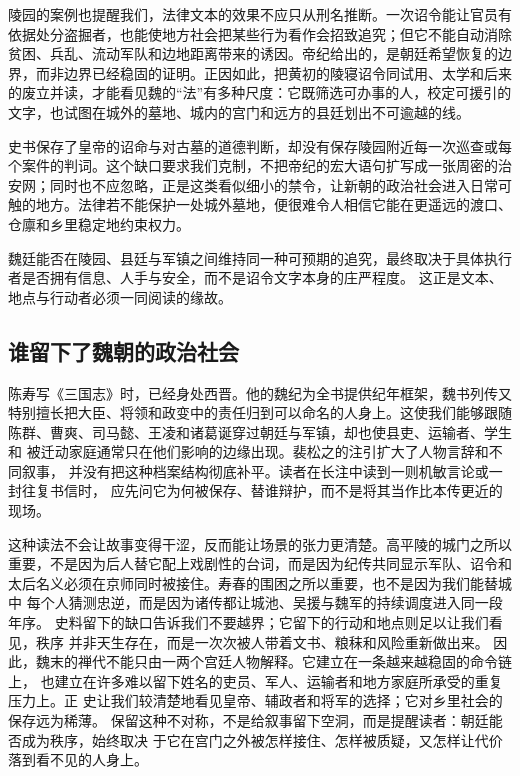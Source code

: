 陵园的案例也提醒我们，法律文本的效果不应只从刑名推断。一次诏令能让官员有依据处分盗掘者，也能使地方社会把某些行为看作会招致追究；但它不能自动消除贫困、兵乱、流动军队和边地距离带来的诱因。帝纪给出的，是朝廷希望恢复的边界，而非边界已经稳固的证明。正因如此，把黄初的陵寝诏令同试用、太学和后来的废立并读，才能看见魏的“法”有多种尺度：它既筛选可办事的人，校定可援引的文字，也试图在城外的墓地、城内的宫门和远方的县廷划出不可逾越的线。

史书保存了皇帝的诏命与对古墓的道德判断，却没有保存陵园附近每一次巡查或每个案件的判词。这个缺口要求我们克制，不把帝纪的宏大语句扩写成一张周密的治安网；同时也不应忽略，正是这类看似细小的禁令，让新朝的政治社会进入日常可触的地方。法律若不能保护一处城外墓地，便很难令人相信它能在更遥远的渡口、仓廪和乡里稳定地约束权力。

魏廷能否在陵园、县廷与军镇之间维持同一种可预期的追究，最终取决于具体执行者是否拥有信息、人手与安全，而不是诏令文字本身的庄严程度。
这正是文本、地点与行动者必须一同阅读的缘故。

\subsection{谁留下了魏朝的政治社会}

陈寿写《三国志》时，已经身处西晋。他的魏纪为全书提供纪年框架，魏书列传又
特别擅长把大臣、将领和政变中的责任归到可以命名的人身上。这使我们能够跟随
陈群、曹爽、司马懿、王凌和诸葛诞穿过朝廷与军镇，却也使县吏、运输者、学生和
被迁动家庭通常只在他们影响的边缘出现。裴松之的注引扩大了人物言辞和不同叙事，
并没有把这种档案结构彻底补平。读者在长注中读到一则机敏言论或一封往复书信时，
应先问它为何被保存、替谁辩护，而不是将其当作比本传更近的现场。

这种读法不会让故事变得干涩，反而能让场景的张力更清楚。高平陵的城门之所以
重要，不是因为后人替它配上戏剧性的台词，而是因为纪传共同显示军队、诏令和
太后名义必须在京师同时被接住。寿春的围困之所以重要，也不是因为我们能替城中
每个人猜测忠逆，而是因为诸传都让城池、吴援与魏军的持续调度进入同一段年序。
史料留下的缺口告诉我们不要越界；它留下的行动和地点则足以让我们看见，秩序
并非天生存在，而是一次次被人带着文书、粮秣和风险重新做出来。
因此，魏末的禅代不能只由一两个宫廷人物解释。它建立在一条越来越稳固的命令链上，
也建立在许多难以留下姓名的吏员、军人、运输者和地方家庭所承受的重复压力上。正
史让我们较清楚地看见皇帝、辅政者和将军的选择；它对乡里社会的保存远为稀薄。
保留这种不对称，不是给叙事留下空洞，而是提醒读者：朝廷能否成为秩序，始终取决
于它在宫门之外被怎样接住、怎样被质疑，又怎样让代价落到看不见的人身上。

